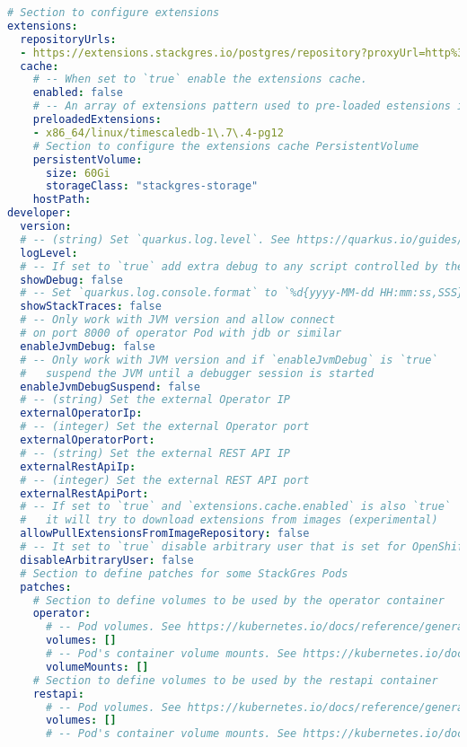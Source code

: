 \begin{lstlisting}[language=yaml, caption=StackGres-Citus - Helm Chart Manifest,captionpos=b,label={lst:stackgres_citus-values.yaml},breaklines=true]
# Section to configure extensions
extensions:
  repositoryUrls:
  - https://extensions.stackgres.io/postgres/repository?proxyUrl=http%3A%2F%2Fsproxy.sivc.first-it.ch%3A8080?skipHostnameVerification:true&setHttpScheme:true
  cache:
    # -- When set to `true` enable the extensions cache.
    enabled: false
    # -- An array of extensions pattern used to pre-loaded estensions into the extensions cache
    preloadedExtensions:
    - x86_64/linux/timescaledb-1\.7\.4-pg12
    # Section to configure the extensions cache PersistentVolume
    persistentVolume:
      size: 60Gi
      storageClass: "stackgres-storage"
    hostPath:
developer:
  version:
  # -- (string) Set `quarkus.log.level`. See https://quarkus.io/guides/logging#root-logger-configuration
  logLevel:
  # -- If set to `true` add extra debug to any script controlled by the reconciliation cycle of the operator configuration
  showDebug: false
  # -- Set `quarkus.log.console.format` to `%d{yyyy-MM-dd HH:mm:ss,SSS} %-5p [%c{4.}] (%t) %s%e%n`. See https://quarkus.io/guides/logging#logging-format
  showStackTraces: false
  # -- Only work with JVM version and allow connect
  # on port 8000 of operator Pod with jdb or similar
  enableJvmDebug: false
  # -- Only work with JVM version and if `enableJvmDebug` is `true`
  #   suspend the JVM until a debugger session is started
  enableJvmDebugSuspend: false
  # -- (string) Set the external Operator IP
  externalOperatorIp:
  # -- (integer) Set the external Operator port
  externalOperatorPort:
  # -- (string) Set the external REST API IP
  externalRestApiIp:
  # -- (integer) Set the external REST API port
  externalRestApiPort:
  # -- If set to `true` and `extensions.cache.enabled` is also `true`
  #   it will try to download extensions from images (experimental)
  allowPullExtensionsFromImageRepository: false
  # -- It set to `true` disable arbitrary user that is set for OpenShift clusters
  disableArbitraryUser: false
  # Section to define patches for some StackGres Pods
  patches:
    # Section to define volumes to be used by the operator container
    operator:
      # -- Pod volumes. See https://kubernetes.io/docs/reference/generated/kubernetes-api/v1.27/#volume-v1-core
      volumes: []
      # -- Pod's container volume mounts. See https://kubernetes.io/docs/reference/generated/kubernetes-api/v1.27/#volumemount-v1-core
      volumeMounts: []
    # Section to define volumes to be used by the restapi container
    restapi:
      # -- Pod volumes. See https://kubernetes.io/docs/reference/generated/kubernetes-api/v1.27/#volume-v1-core
      volumes: []
      # -- Pod's container volume mounts. See https://kubernetes.io/docs/reference/generated/kubernetes-api/v1.27/#volumemount-v1-core

\end{lstlisting}
